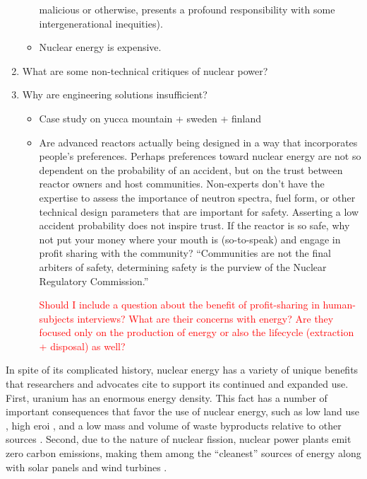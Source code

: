 \begin{enumerate}
\begin{itemize}
    malicious or otherwise, presents a profound responsibility with some
    intergenerational inequities).
    \item Nuclear energy is expensive.
\end{itemize}
\item What are some non-technical critiques of nuclear power?
\item Why are engineering solutions insufficient?
\begin{itemize}
    \item Case study on yucca mountain + sweden + finland
    \item Are advanced reactors actually being designed in a way that incorporates people's preferences.
    Perhaps preferences toward nuclear energy are not so dependent on the probability of an accident, but
    on the trust between reactor owners and host communities. Non-experts don't have the expertise to assess
    the importance of neutron spectra, fuel form, or other technical design parameters that are important for safety.
    Asserting a low accident probability does not inspire trust. If the reactor is so safe, why not put your money
    where your mouth is (so-to-speak) and engage in profit sharing with the community? 
    ``Communities are not the final arbiters of safety, determining safety is the purview of the Nuclear Regulatory Commission.''


    \textcolor{red}{Should I include a question about the benefit of profit-sharing in human-subjects interviews? 
    What are their concerns with energy? Are they focused only on the production of energy or also the lifecycle 
    (extraction + disposal) as well?}
\end{itemize}
\end{enumerate}




In spite of its complicated history, nuclear energy has a variety of unique benefits that researchers and
advocates cite to support its continued and expanded use. First, uranium has an enormous energy density. This
fact has a number of important consequences that favor the use of nuclear energy, such as low land use 
\cite{lovering_land-use_2022,van_zalk_spatial_2018}, high \ac{eroi} \cite{weisbach_energy_2013,murphy_energy_2022},
and a low mass and volume of waste byproducts relative to other sources 
\cite{liu_wind_2017,chowdhury_overview_2020,holdsworth_spent_2023,taebi_recycle_2008}. Second, due to the nature of
nuclear fission, nuclear power plants emit zero carbon emissions, making them among the ``cleanest'' sources of 
energy along with solar panels and wind turbines \cite{nicholson_life_2021,intergovernmental_panel_on_climate_change_climate_2021}.
